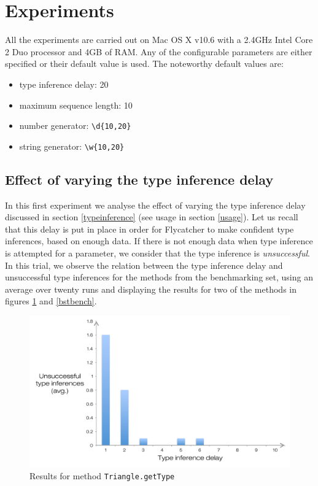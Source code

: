\section{Experiments}
All the experiments are carried out on Mac OS X v10.6 with a 2.4GHz Intel Core 2 Duo processor and 4GB of RAM. Any of the configurable parameters are either specified or their default value is used. The noteworthy default values are:

\begin{itemize}
   \item type inference delay: 20
   \item maximum sequence length: 10
   \item number generator: \texttt{\textbackslash d\{10,20\}}
   \item string generator: \texttt{\textbackslash w\{10,20\}}
\end{itemize}

\subsection{Effect of varying the type inference delay}
In this first experiment we analyse the effect of varying the type inference delay discussed in section \ref{typeinference} (see usage in section \ref{usage}). Let us recall that this delay is put in place in order for \textsf{Flycatcher} to make confident type inferences, based on enough data. If there is not enough data when type inference is attempted for a parameter, we consider that the type inference is \emph{unsuccessful}. In this trial, we observe the relation between the type inference delay and unsuccessful type inferences for the methods from the benchmarking set, using an average over twenty runs and displaying the results for two of the methods in figures \ref{trianglebench} and \ref{bstbench}.

\begin{figure}[h]
\hspace*{-0.5cm}
\centering
\includegraphics[scale=0.55]{./components/chapter7/triangle.pdf}
\caption{Results for method \texttt{Triangle.getType}}
\label{trianglebench}
\end{figure}

